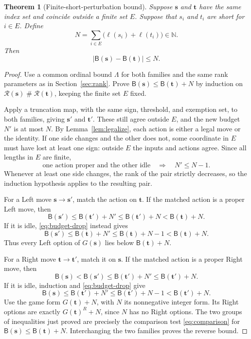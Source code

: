 \documentclass[11pt,letterpaper]{article}
\newtheorem{theorem}{Theorem}[section]
\theoremstyle{definition}
\theoremstyle{remark}
\newcommand{\NN}{\mathbb N}
\newcommand{\BB}{\mathsf B}
\newcommand{\bs}{\boldsymbol{s}}
\newcommand{\bt}{\boldsymbol{t}}
\newcommand{\ns}{\mathbin{\#}}
\newcommand{\len}{\ell}
\newcommand{\Rk}{\mathcal R}
\begin{document}
\begin{theorem}[Finite-short-perturbation bound]\label{thm:perturbation}
Suppose $\bs$ and $\bt$ have the same index set and coincide outside a finite
set $E$. Suppose that $s_i$ and $t_i$ are short for $i\in E$. Define
\begin{equation}\label{eq:perturbation-budget}
                    N=\sum_{i\in E}\bigl(\len(s_i)+\len(t_i)\bigr)\in\NN.
\end{equation}
Then
\begin{equation}\label{eq:perturbation-bound}
                       |\BB(\bs)-\BB(\bt)|\leq N.
\end{equation}
\end{theorem}
\begin{proof}
Use a common ordinal bound $\Lambda$ for both families and the same rank
parameters as in Section~\ref{sec:rank}. Prove
$\BB(\bs)\leq\BB(\bt)+N$ by induction on
$\Rk(\bs)\ns\Rk(\bt)$, keeping the finite set $E$ fixed.

Apply a truncation map, with the same sign, threshold, and exemption set, to
both families, giving $\bs'$ and $\bt'$. These still agree outside $E$, and the
new budget $N'$ is at most $N$. By Lemma~\ref{lem:legalize}, each action is either
a legal move or the identity. If one side changes and the other does not, some
coordinate in $E$ must have lost at least one sign: outside $E$ the inputs and
actions agree. Since all lengths in $E$ are finite,
\begin{equation}\label{eq:budget-drop}
       \text{one action proper and the other idle}\quad\Longrightarrow\quad
                            N'\leq N-1.
\end{equation}
Whenever at least one side changes, the rank of the pair strictly decreases,
so the induction hypothesis applies to the resulting pair.

For a Left move $\bs\to\bs'$, match the action on $\bt$. If the matched action
is a proper Left move, then
\[
 \BB(\bs')\leq\BB(\bt')+N'
           \leq\BB(\bt')+N<\BB(\bt)+N.
\]
If it is idle, \eqref{eq:budget-drop} instead gives
\[
 \BB(\bs')\leq\BB(\bt)+N'\leq\BB(\bt)+N-1<\BB(\bt)+N.
\]
Thus every Left option of $G(\bs)$ lies below $\BB(\bt)+N$.

For a Right move $\bt\to\bt'$, match it on $\bs$. If the matched action is a
proper Right move, then
\[
 \BB(\bs)<\BB(\bs')\leq\BB(\bt')+N'\leq\BB(\bt')+N.
\]
If it is idle, induction and \eqref{eq:budget-drop} give
\[
 \BB(\bs)\leq\BB(\bt')+N'\leq\BB(\bt')+N-1<\BB(\bt')+N.
\]
Use the game form $G(\bt)+N$, with $N$ its nonnegative integer form. Its Right
options are exactly $G(\bt)^R+N$, since $N$ has no Right options. The two groups
of inequalities just proved are precisely the comparison test
\eqref{eq:comparison} for $\BB(\bs)\leq\BB(\bt)+N$. Interchanging the two
families proves the reverse bound.
\end{proof}
\end{document}
